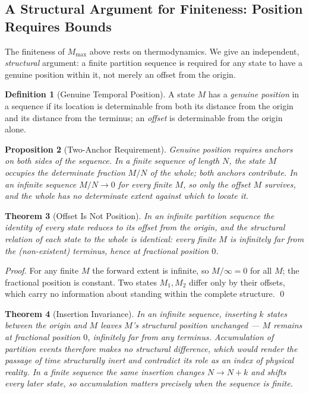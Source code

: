 \documentclass[twocolumn,10pt,a4paper]{article}
\theoremstyle{thmstyle}
\newtheorem{theorem}{Theorem}[section]
\newtheorem{proposition}[theorem]{Proposition}
\theoremstyle{definition}
\newtheorem{definition}[theorem]{Definition}
\theoremstyle{remark}
\newcommand{\Mmax}{M_{\max}}
\begin{document}
\subsection{A Structural Argument for Finiteness: Position Requires Bounds}
\label{sec:position-bounds}

The finiteness of $\Mmax$ above rests on thermodynamics. We give an independent,
\emph{structural} argument: a finite partition sequence is required for any state
to have a genuine position within it, not merely an offset from the origin.

\begin{definition}[Genuine Temporal Position]
\label{def:position}
A state $M$ has a \emph{genuine position} in a sequence if its location is
determinable from both its distance from the origin and its distance from the
terminus; an \emph{offset} is determinable from the origin alone.
\end{definition}

\begin{proposition}[Two-Anchor Requirement]
\label{prop:two-anchors}
Genuine position requires anchors on both sides of the sequence. In a finite
sequence of length $N$, the state $M$ occupies the determinate fraction $M/N$ of
the whole; both anchors contribute. In an infinite sequence $M/N \to 0$ for every
finite $M$, so only the offset $M$ survives, and the whole has no determinate
extent against which to locate it.
\end{proposition}

\begin{theorem}[Offset Is Not Position]
\label{thm:offset}
In an infinite partition sequence the identity of every state reduces to its
offset from the origin, and the structural relation of each state to the whole
is identical: every finite $M$ is infinitely far from the (non-existent)
terminus, hence at fractional position $0$.
\end{theorem}

\begin{proof}
For any finite $M$ the forward extent is infinite, so $M/\infty = 0$ for all $M$;
the fractional position is constant. Two states $M_1, M_2$ differ only by their
offsets, which carry no information about standing within the complete
structure. \qed
\end{proof}

\begin{theorem}[Insertion Invariance]
\label{thm:insertion}
In an infinite sequence, inserting $k$ states between the origin and $M$ leaves
$M$'s structural position unchanged --- $M$ remains at fractional position $0$,
infinitely far from any terminus. Accumulation of partition events therefore
makes no structural difference, which would render the passage of time
structurally inert and contradict its role as an index of physical reality. In a
finite sequence the same insertion changes $N \to N+k$ and shifts every later
state, so accumulation matters precisely when the sequence is finite.
\end{theorem}
\end{document}
